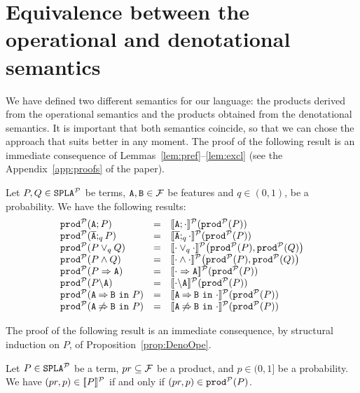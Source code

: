 \section{Equivalence between the operational and denotational semantics}\label{sec:equivalence}
We have defined two different semantics for our language:
the products derived from the operational semantics and the products
obtained from the denotational semantics. It is important that
both semantics coincide, so that we can chose the approach that suits
better in any moment. The proof of the following result is an immediate consequence of Lemmas~\ref{lem:pref}--\ref{lem:excl} (see the Appendix~\ref{app:proofs} of the paper).

\bprop\label{prop:DenoOpe}
  Let $P,Q\in\mathtt{SPLA{^{\cal P}}}$ be terms, $\mathtt{A},\mathtt{B}\in{\cal F}$ be features and $q\in (0,1)$, be a probability. We have the following results:
  $$\begin{array}{lll}
  \prodp(\feature{A};P)&=&\semdenp{\feature{A};\cdot}(\prodp(P))\\
  \prodp(\ofeature{A};_qP)&=&\semdenp{\ofeature{A};_q\cdot}(\prodp(P))\\
  \prodp(P\choice_q Q)&=&\semdenp{\cdot\choice_q\cdot}\bigl(\prodp(P),\prodp(Q)\bigr)\\
  \prodp(P\paral Q)&=&\semdenp{\cdot\paral\cdot}\bigl(\prodp(P),\prodp(Q)\bigr)\\
  \prodp(\mandatory{A}{P})&=&\semdenp{\mandatory{A}{\cdot}}(\prodp(P))\\
  \prodp(\forbid{A}{P})&=&\semdenp{\forbid{A}{\cdot}}(\prodp(P))\\
  \prodp(\require{A}{B}{P})&=&\semdenp{\require{A}{B}{\cdot}}(\prodp(P))\\
  \prodp(\exclude{A}{B}{P})&=&\semdenp{\exclude{A}{B}{\cdot}}(\prodp(P))
\end{array}$$
\eprop

The proof of the following result is an immediate consequence, by structural induction on $P$, of
Proposition~\ref{prop:DenoOpe}.


\bthm\label{prop:equivprob}
  Let $P\in\mathtt{SPLA{^{\cal P}}}$ be a term, $pr\subseteq{\cal F}$ be a product, and
  $p\in(0,1]$ be a probability. We have $ (pr,p)\in[\![P]\!]^{\cal P}$ if and only if
  $(pr,p)\in\mathtt{prod}^{\cal P}(P)$.
\ethm



